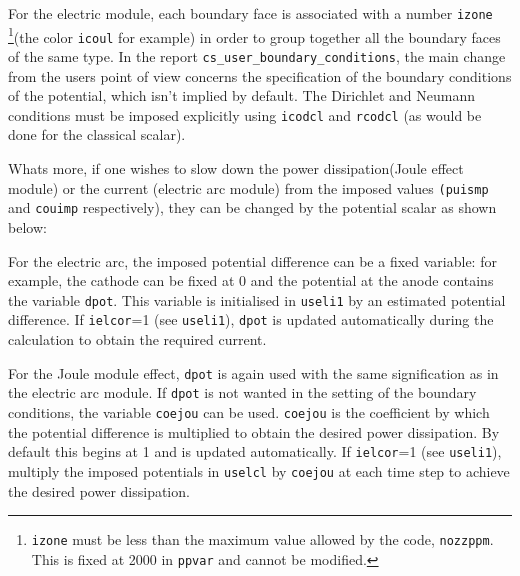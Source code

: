 {{{For the electric module, each boundary face is associated with a number
 \texttt{izone} \footnote{\texttt{izone} must be less than the maximum
 value allowed by the code, \texttt{nozzppm}. This is fixed at 2000 in \texttt
{ppvar} and cannot be modified.}(the color \texttt{icoul} for example) in
 order to group together all the boundary faces of the same type. In the report
 \texttt{cs\_user\_boundary\_conditions}, the main change from the users point of view concerns the
 specification of the boundary conditions of the potential, which isn't
 implied by default. The Dirichlet and Neumann conditions must be imposed
 explicitly using \texttt{icodcl} and \texttt{rcodcl} (as would be done for
 the classical scalar).

Whats more, if one wishes to slow down the power dissipation(Joule
effect module) or the current (electric arc module) from the imposed values
\texttt{(puismp} and \texttt{couimp} respectively),
 they can be changed by the potential scalar as shown below:

\begin{list}{-}{}
\item For the electric arc, the imposed potential difference can be a fixed variable:
 for example, the cathode can be fixed at 0 and the potential at the anode
 contains the variable \texttt{dpot}. This variable is initialised in \texttt{useli1}
 by an estimated potential difference. If \texttt{ielcor}=1 (see
 \texttt{useli1}), \texttt{dpot} is updated automatically during the
 calculation to obtain the required current.
\item For the Joule module effect, \texttt{dpot} is again used with the same
 signification as in the electric arc module. If \texttt{dpot} is not wanted
 in the setting of the boundary conditions, the variable \texttt{coejou} can be
 used. \texttt{coejou} is the coefficient by which the potential difference is
 multiplied to obtain the desired power dissipation. By default this begins at
 1 and is updated automatically. If \texttt{ielcor}=1 (see \texttt
{useli1}), multiply the imposed potentials in \texttt{uselcl} by \texttt{coejou}
 at each time step to achieve the desired power dissipation.
 \end{list}

}}}
